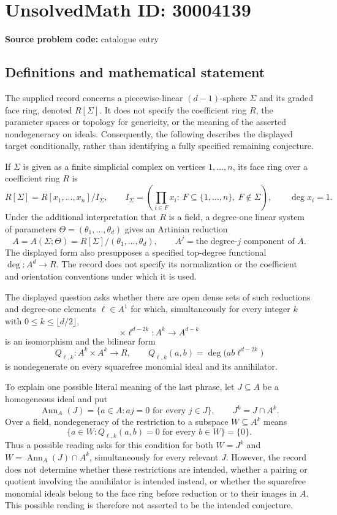 \documentclass[11pt]{article}
\begin{document}
\section*{UnsolvedMath ID: 30004139}
\textbf{Source problem code:} catalogue entry
\subsection{Definitions and mathematical statement}
The supplied record concerns a piecewise-linear \((d-1)\)-sphere \(\Sigma\) and its graded face ring, denoted \(R[\Sigma]\). It does not specify the coefficient ring \(R\), the parameter spaces or topology for genericity, or the meaning of the asserted nondegeneracy on ideals. Consequently, the following describes the displayed target conditionally, rather than identifying a fully specified remaining conjecture.

If \(\Sigma\) is given as a finite simplicial complex on vertices \(1,\ldots,n\), its face ring over a coefficient ring \(R\) is
\[
R[\Sigma]=R[x_1,\ldots,x_n]/I_\Sigma,
\qquad
I_\Sigma=\left(\prod_{i\in F}x_i:\ F\subseteq\{1,\ldots,n\},\ F\notin\Sigma\right),
\qquad \deg x_i=1.
\]
Under the additional interpretation that \(R\) is a field, a degree-one linear system of parameters \(\Theta=(\theta_1,\ldots,\theta_d)\) gives an Artinian reduction
\[
A=A(\Sigma;\Theta)=R[\Sigma]/(\theta_1,\ldots,\theta_d),
\qquad A^j=\text{the degree-}j\text{ component of }A.
\]
The displayed form also presupposes a specified top-degree functional \(\deg:A^d\to R\). The record does not specify its normalization or the coefficient and orientation conventions under which it is used.

The displayed question asks whether there are open dense sets of such reductions and degree-one elements \(\ell\in A^1\) for which, simultaneously for every integer \(k\) with \(0\leq k\leq\lfloor d/2\rfloor\),
\[
\times\ell^{d-2k}:A^k\longrightarrow A^{d-k}
\]
is an isomorphism and the bilinear form
\[
Q_{\ell,k}:A^k\times A^k\longrightarrow R,
\qquad
Q_{\ell,k}(a,b)=\deg\bigl(ab\ell^{d-2k}\bigr)
\]
is nondegenerate on every squarefree monomial ideal and its annihilator.

To explain one possible literal meaning of the last phrase, let \(J\subseteq A\) be a homogeneous ideal and put
\[
\operatorname{Ann}_A(J)=\{a\in A:aj=0\text{ for every }j\in J\},
\qquad J^k=J\cap A^k.
\]
Over a field, nondegeneracy of the restriction to a subspace \(W\subseteq A^k\) means
\[
\{a\in W:Q_{\ell,k}(a,b)=0\text{ for every }b\in W\}=\{0\}.
\]
Thus a possible reading asks for this condition for both \(W=J^k\) and \(W=\operatorname{Ann}_A(J)\cap A^k\), simultaneously for every relevant \(J\). However, the record does not determine whether these restrictions are intended, whether a pairing or quotient involving the annihilator is intended instead, or whether the squarefree monomial ideals belong to the face ring before reduction or to their images in \(A\). This possible reading is therefore not asserted to be the intended conjecture.
\end{document}
